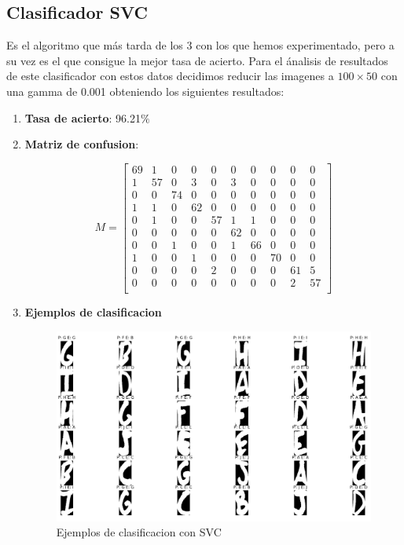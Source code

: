 \documentclass[8pt,a4paper]{article}
\begin{document}
\subsection{Clasificador SVC}

Es el algoritmo que más tarda de los 3 con los que hemos experimentado, pero a su vez es el que consigue la mejor tasa de acierto. Para el ánalisis de resultados de este clasificador con estos datos decidimos reducir las imagenes a $100\times50$ con una gamma de 0.001 obteniendo los siguientes resultados:
\begin{enumerate}
\item \textbf{Tasa de acierto}: 96.21$\%$
\item \textbf{Matriz de confusion}:
	
\[
M=
  \begin{bmatrix}
    69 & 1 & 0 & 0 & 0 & 0 & 0 & 0 & 0 & 0 \\
    1 & 57 & 0 & 3 & 0 & 3 & 0 & 0 & 0 & 0 \\
    0 & 0 & 74 & 0 & 0 & 0 & 0 & 0 & 0 & 0 \\
    1 & 1 & 0 & 62 & 0 & 0 & 0 & 0 & 0 & 0 \\
    0 & 1 & 0 & 0 & 57 & 1 & 1 & 0 & 0 & 0 \\
    0 & 0 & 0 & 0 & 0 & 62 & 0 & 0 & 0 & 0 \\
    0 & 0 & 1 & 0 & 0 & 1 & 66 & 0 & 0 & 0 \\
    1 & 0 & 0 & 1 & 0 & 0 & 0 & 70 & 0 & 0 \\
    0 & 0 & 0 & 0 & 2 & 0 & 0 & 0 & 61 & 5 \\
    0 & 0 & 0 & 0 & 0 & 0 & 0 & 0 & 2 & 57 \\
  \end{bmatrix}
\]

\item \textbf{Ejemplos de clasificacion}

\begin{figure}[htbp]
    \includegraphics[width=\textwidth]{./SVC100_50.png}
    \caption{Ejemplos de clasificacion con SVC}
\end{figure}
\end{enumerate}
\end{document}
